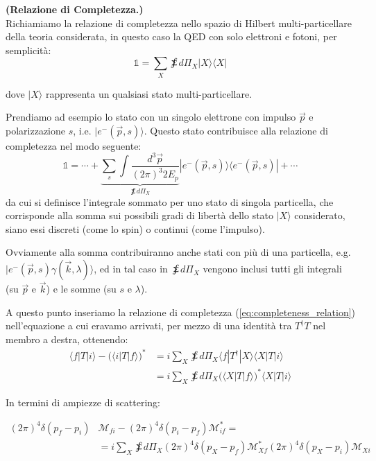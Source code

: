 \documentclass[../main.tex]{subfiles}
\begin{document}
\begin{nota}
    \textbf{(Relazione di Completezza.)}\\
    Richiamiamo la relazione di completezza nello spazio di Hilbert multi-particellare della teoria considerata, in questo caso la QED con solo elettroni e fotoni, per semplicità:
    \begin{equation}
        \mathbb 1 = \sum_X \sumint d\Pi_X |X\rangle \langle X|
        \label{eq:completeness_relation}
    \end{equation}

    dove \(|X\rangle\) rappresenta un qualsiasi stato multi-particellare.

    Prendiamo ad esempio lo stato con un singolo elettrone con impulso $\Vec p$ e polarizzazione $s$, i.e. \(|e^-(\Vec{p}, s)\rangle \). Questo stato contribuisce alla relazione di completezza nel modo seguente:
    \[
    \mathbb 1 = \cdots + \underbrace{\sum_s \int \frac{d^3\Vec{p}}{(2\pi)^3 2E_p}}_{\sumint d\Pi_X} |e^-(\Vec{p}, s)\rangle \langle e^-(\Vec{p}, s)| + \cdots
    \]
    da cui si definisce l'integrale sommato per uno stato di singola particella, che corrisponde alla somma sui possibili gradi di libertà dello stato \(|X\rangle\) considerato, siano essi discreti (come lo spin) o continui (come l'impulso).

    Ovviamente alla somma contribuiranno anche stati con più di una particella, e.g. \(|e^-(\Vec{p}, s) \gamma(\Vec k, \lambda) \rangle \), ed in tal caso in \(\sumint d\Pi_X\) vengono inclusi tutti gli integrali (su $\Vec{p}$ e $\Vec{k}$) e le somme (su $s$ e $\lambda$).
\end{nota}

A questo punto inseriamo la relazione di completezza (\ref{eq:completeness_relation}) nell'equazione a cui eravamo arrivati, per mezzo di una identità tra \(T^\dagger T\) nel membro a destra, ottenendo:
\begin{align*}
    \langle f | T | i \rangle - \big(\langle i | T | f \rangle \big)^\ast 
    & = i \sum_X \sumint d\Pi_X \langle f | T^\dagger |X\rangle \langle X| T | i \rangle \\
    & = i \sum_X \sumint d\Pi_X \big(\langle X | T |f\rangle\big)^* \langle X| T | i \rangle
\end{align*}

In termini di ampiezze di scattering:

\begin{align*}
    (2\pi)^4\delta(p_f-p_i) &\mathscr M_{fi} - (2\pi)^4\delta(p_i-p_f) \mathscr M^*_{if} = \\
    &= i \sum_X \sumint d\Pi_X (2\pi)^4\delta(p_X-p_f)\mathscr M^*_{Xf} (2\pi)^4\delta(p_X-p_i)\mathscr M_{Xi}
\end{align*}
\end{document}
